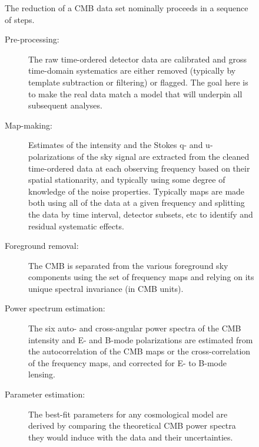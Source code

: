 \begin{figure}[htbp]
\begin{minipage}[h]{0.6\linewidth}
The reduction of a CMB data set nominally proceeds in a sequence of steps.
\begin{description}
\item[ Pre-processing:] The raw time-ordered detector data are calibrated and gross time-domain systematics are either removed (typically by template subtraction or filtering) or flagged. The goal here is to make the real data match a model that will underpin all subsequent analyses.
\item[Map-making:] Estimates of the intensity and the Stokes q- and u-polarizations of the sky signal are extracted from the cleaned time-ordered data at each observing frequency based on their spatial stationarity, and typically using some degree of knowledge of the noise properties. Typically maps are made both using all of the data at a given frequency and splitting the data by time interval, detector subsets, etc to identify and residual systematic effects.
\item[Foreground removal:] The CMB is separated from the various foreground sky components using the set of frequency maps and relying on its unique spectral invariance (in CMB units).
\item[Power spectrum estimation:] The six auto- and cross-angular power spectra of the CMB intensity and E- and B-mode polarizations are estimated from the autocorrelation of the CMB maps or the cross-correlation of the frequency maps, and corrected for E- to B-mode lensing.
\item[Parameter estimation:] The best-fit parameters for any cosmological model are derived by comparing the theoretical CMB power spectra they would induce with the data and their uncertainties.
\end{description}
\end{minipage}
\begin{minipage}[h]{0.4\linewidth}
\begin{center}

\end{center}
\end{minipage}
\end{figure}
